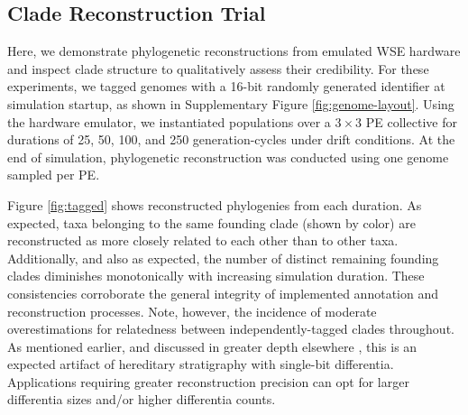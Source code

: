 \subsection{Clade Reconstruction Trial}


Here, we demonstrate phylogenetic reconstructions from emulated WSE hardware and inspect clade structure to qualitatively assess their credibility.
For these experiments, we tagged genomes with a 16-bit randomly generated identifier at simulation startup, as shown in Supplementary Figure \ref{fig:genome-layout}.
Using the hardware emulator, we instantiated populations over a $3\times3$ PE collective for durations of 25, 50, 100, and 250 generation-cycles under drift conditions.
At the end of simulation, phylogenetic reconstruction was conducted using one genome sampled per PE.



Figure \ref{fig:tagged} shows reconstructed phylogenies from each duration.
As expected, taxa belonging to the same founding clade (shown by color) are reconstructed as more closely related to each other than to other taxa.
Additionally, and also as expected, the number of distinct remaining founding clades diminishes monotonically with increasing simulation duration.
These consistencies corroborate the general integrity of implemented annotation and reconstruction processes.
Note, however, the incidence of moderate overestimations for relatedness between independently-tagged clades throughout.
As mentioned earlier, and discussed in greater depth elsewhere \citep{TODOOTHERPAPER}, this is an expected artifact of hereditary stratigraphy with single-bit differentia.
Applications requiring greater reconstruction precision can opt for larger differentia sizes and/or higher differentia counts.


